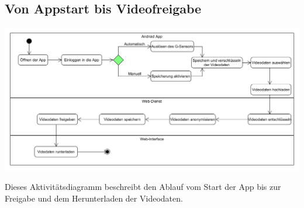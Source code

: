 \subsection{Von Appstart bis Videofreigabe}
\begin{center}
\includegraphics[width=1\textwidth]{subtopicsFuncspec/Res/systemModels/AKDiagramm.png}
\end{center}
Dieses Aktivitätsdiagramm beschreibt den Ablauf vom Start der \gls{App} bis zur Freigabe und dem Herunterladen der Videodaten. 
